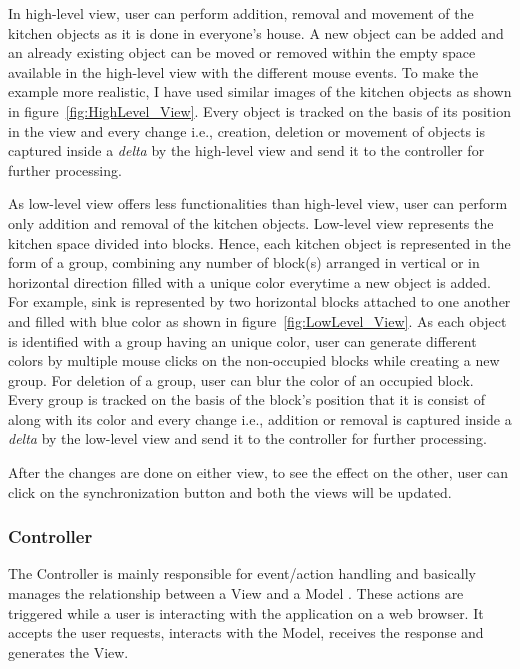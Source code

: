 In high-level view, user can perform addition, removal and movement of the kitchen objects as it is done in everyone's house. A new object can be added and an already existing object can be moved or removed within the empty space available in the high-level view with the different mouse events. To make the example more realistic, I have used similar images of the kitchen objects as shown in figure~\ref{fig:HighLevel_View}. Every object is tracked on the basis of its position in the view and every change i.e., creation, deletion or movement of objects is captured inside a \textit{delta} by the high-level view and send it to the controller for further processing.

As low-level view offers less functionalities than high-level view, user can perform only addition and removal of the kitchen objects. Low-level view represents the kitchen space divided into blocks. Hence, each kitchen object is represented in the form of a group, combining any number of block(s) arranged in vertical or in horizontal direction filled with a unique color everytime a new object is added. For example, sink is represented by two horizontal blocks attached to one another and filled with {\color{blue} blue} color as shown in figure~\ref{fig:LowLevel_View}. As each object is identified with a group having an unique color, user can generate different colors by multiple mouse clicks on the non-occupied blocks while creating a new group. For deletion of a group, user can blur the color of an occupied block. Every group is tracked on the basis of the block's position that it is consist of along with its color and every change i.e., addition or removal is captured inside a \textit{delta} by the low-level view and send it to the controller for further processing.

After the changes are done on either view, to see the effect on the other, user can click on the synchronization button and both the views will be updated.
 
\subsubsection{Controller}\label{subsubsec:controller}
The Controller is mainly responsible for event/action handling and basically manages the relationship between a View and a Model \cite{mdd-webwithmvc}. These actions are triggered while a user is interacting with the application on a web browser. It accepts the user requests, interacts with
the Model, receives the response and generates the View.

